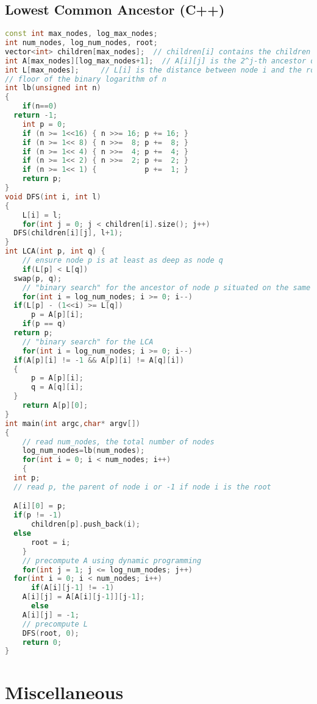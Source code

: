 \subsection{Lowest Common Ancestor (C++)}
\begin{lstlisting}[language=C++]
const int max_nodes, log_max_nodes;
int num_nodes, log_num_nodes, root;
vector<int> children[max_nodes];  // children[i] contains the children of node i
int A[max_nodes][log_max_nodes+1];  // A[i][j] is the 2^j-th ancestor of node i, or -1 if that ancestor does not exist
int L[max_nodes];     // L[i] is the distance between node i and the root
// floor of the binary logarithm of n
int lb(unsigned int n)
{
    if(n==0)
  return -1;
    int p = 0;
    if (n >= 1<<16) { n >>= 16; p += 16; }
    if (n >= 1<< 8) { n >>=  8; p +=  8; }
    if (n >= 1<< 4) { n >>=  4; p +=  4; }
    if (n >= 1<< 2) { n >>=  2; p +=  2; }
    if (n >= 1<< 1) {           p +=  1; }
    return p;
}
void DFS(int i, int l)
{
    L[i] = l;
    for(int j = 0; j < children[i].size(); j++)
  DFS(children[i][j], l+1);
}
int LCA(int p, int q) {
    // ensure node p is at least as deep as node q
    if(L[p] < L[q])
  swap(p, q);
    // "binary search" for the ancestor of node p situated on the same level as q
    for(int i = log_num_nodes; i >= 0; i--)
  if(L[p] - (1<<i) >= L[q])
      p = A[p][i];
    if(p == q)
  return p;
    // "binary search" for the LCA
    for(int i = log_num_nodes; i >= 0; i--)
  if(A[p][i] != -1 && A[p][i] != A[q][i])
  {
      p = A[p][i];
      q = A[q][i];
  }
    return A[p][0];
}
int main(int argc,char* argv[])
{
    // read num_nodes, the total number of nodes
    log_num_nodes=lb(num_nodes);
    for(int i = 0; i < num_nodes; i++)
    {
  int p;
  // read p, the parent of node i or -1 if node i is the root

  A[i][0] = p;
  if(p != -1)
      children[p].push_back(i);
  else
      root = i;
    }
    // precompute A using dynamic programming
    for(int j = 1; j <= log_num_nodes; j++)
  for(int i = 0; i < num_nodes; i++)
      if(A[i][j-1] != -1)
    A[i][j] = A[A[i][j-1]][j-1];
      else
    A[i][j] = -1;
    // precompute L
    DFS(root, 0);   
    return 0;
}
\end{lstlisting}
\section{Miscellaneous}
